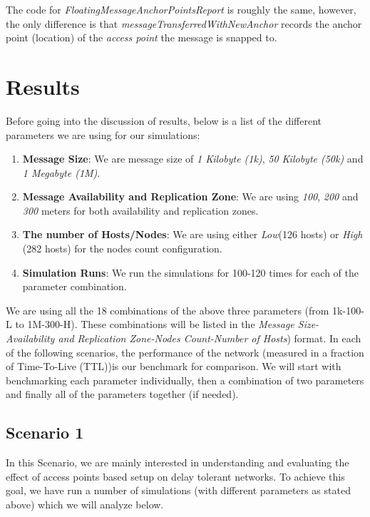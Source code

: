 The code for \textit{FloatingMessageAnchorPointsReport} is roughly the same, however, the only difference is that \textit{messageTransferredWithNewAnchor} records the anchor point (location) of the \textit{access point} the message is snapped to.


\section{Results}
Before going into the discussion of results, below is a list of the different parameters we are using for our simulations:
\begin{enumerate}
  \item \textbf{Message Size}: We are message size of \textit{1 Kilobyte (1k)}, \textit{50 Kilobyte (50k)} and \textit{1 Megabyte (1M)}.
  \item \textbf{Message Availability and Replication Zone}: We are using \textit{100}, \textit{200} and \textit{300} meters for both availability and replication zones.
  \item \textbf{The number of Hosts/Nodes}: We are using either \textit{Low}(126 hosts) or \textit{High} (282 hosts) for the nodes count configuration.
  \item \textbf{Simulation Runs}: We run the simulations for 100-120 times for each of the parameter combination.
\end{enumerate}

We are using all the 18 combinations of the above three parameters (from 1k-100-L to 1M-300-H). These combinations will be listed in the \textit{Message Size-Availability and Replication Zone-Nodes Count-Number of Hosts}) format.\newline\newline
In each of the following scenarios, the performance of the network (measured in a fraction of Time-To-Live (TTL))is our benchmark for comparison. We will start with benchmarking each parameter individually, then a combination of two parameters and finally all of the parameters together (if needed).
\subsection{Scenario 1}
In this Scenario, we are mainly interested in understanding and evaluating the effect of access points based setup on delay tolerant networks. To achieve this goal, we have run a number of simulations (with different parameters as stated above) which we will analyze below.
